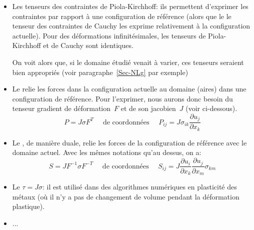 \begin{itemize}
  \item Les tenseurs des contraintes de Piola-Kirchhoff: ils permettent d'exprimer les contraintes par rapport à une configuration de référence (alors que le le tenseur des contraintes de Cauchy les exprime relativement à la configuration actuelle).
	Pour des déformations infinitésimales, les tenseurs de Piola-Kirchhoff et de Cauchy sont identiques.

	On voit alors que, si le domaine étudié venait à varier, ces tenseurs seraient bien
	appropriés (voir paragraphe~\ref{Sec-NLg} par exemple)

  \item Le  relie les forces dans la configuration actuelle au domaine (aires) dans une configuration de référence.
	Pour l'exprimer, nous aurons donc besoin du tenseur gradient de déformation~$F$ et de son jacobien~$J$ (voir ci-dessous).
	\begin{equation}P=J\sigma F^T \quad \text{ de coordonnées } \quad
	P_{ij}= J \sigma_{ik}\frac{\partial u_j}{\partial x_k}\end{equation}

  \item Le , de manière duale, relie les forces de la configuration de référence avec le domaine actuel.
	Avec les mêmes notations qu'au dessus, on a:
	\begin{equation} S=J F^{-1}\sigma F^{-T} \quad \text{ de coordonnées } \quad
	S_{ij} = J \frac{\partial u_i}{\partial x_k}\frac{\partial u_j}{\partial x_m}\sigma_{km}\end{equation}

  \item Le  $\tau = J\sigma$: il est utilisé dans des algorithmes numériques en plasticité des métaux (où il n'y a pas de changement de volume pendant la déformation plastique).

  \item ...
\end{itemize}
